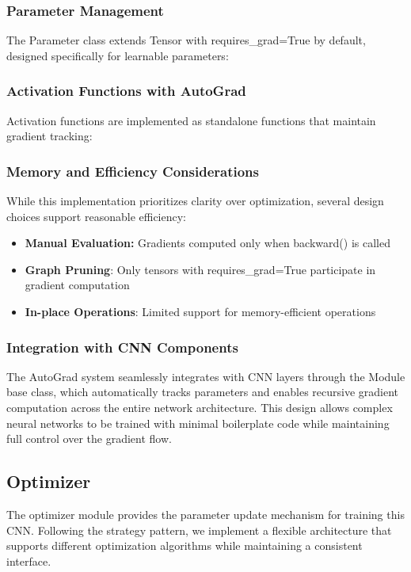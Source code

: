 \documentclass[conference]{IEEEtran}
\begin{document}
\subsubsection{Parameter Management}
The Parameter class extends Tensor with requires\_grad=True by default, designed specifically for learnable parameters:

\subsubsection{Activation Functions with AutoGrad}
Activation functions are implemented as standalone functions that maintain gradient tracking:

\subsubsection{Memory and Efficiency Considerations}
While this implementation prioritizes clarity over optimization, several design choices support reasonable efficiency:
\begin{itemize}
\item \textbf{Manual Evaluation:} Gradients computed only when backward() is called
\item \textbf{Graph Pruning}: Only tensors with requires\_grad=True participate in gradient computation
\item \textbf{In-place Operations}: Limited support for memory-efficient operations
\end{itemize}
\subsubsection{Integration with CNN Components}
The AutoGrad system seamlessly integrates with CNN layers through the Module base class, which automatically tracks parameters and enables recursive gradient computation across the entire network architecture. This design allows complex neural networks to be trained with minimal boilerplate code while maintaining full control over the gradient flow.

\subsection{Optimizer}
The optimizer module provides the parameter update mechanism for training this CNN. Following the strategy pattern, we implement a flexible architecture that supports different optimization algorithms while maintaining a consistent interface.
\end{document}
